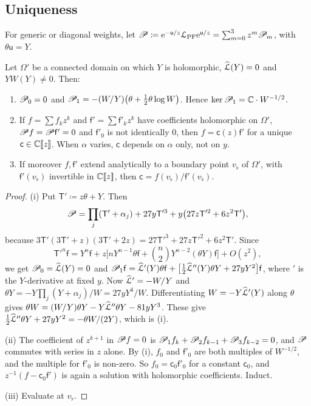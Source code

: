 \subsection{Uniqueness}
\label{sec:row-wkb}

For generic or diagonal weights, let $\mathscr{P}\coloneqq\mathrm{e}^{-\mathsf{u}/z}\mathcal{L}_{\mathrm{PF}}\mathrm{e}^{\mathsf{u}/z}=\sum_{m=0}^{3}z^m\mathscr{P}_m$, with $\theta\mathsf{u}=Y$.

\begin{lem}
\label{lem:row-wkb}
Let $\Omega'$ be a connected domain on which $Y$ is holomorphic, $\widehat{\mathcal{L}}(Y)=0$ and $YW(Y)\neq0$. Then:
\begin{enumerate}
\item $\mathscr{P}_0=0$ and $\mathscr{P}_1=-(W/Y)\big(\theta+\frac12\theta\log W\big)$. Hence $\ker\mathscr{P}_1=\mathbb{C}\cdot W^{-1/2}$.
\item If $f=\sum f_kz^k$ and $\mathsf{f}'=\sum\mathsf{f}'_kz^k$ have coefficients holomorphic on $\Omega'$, $\mathscr{P} f=\mathscr{P}\mathsf{f}'=0$ and $\mathsf{f}'_0$ is not identically $0$, then $f=\mathsf{c}(z)\mathsf{f}'$ for a unique $\mathsf{c}\in\mathbb{C}[\![ z ]\!]$. When $\alpha$ varies, $\mathsf{c}$ depends on $\alpha$ only, not on $y$.
\item If moreover $f,\mathsf{f}'$ extend analytically to a boundary point $v_{\flat}$ of $\Omega'$, with $\mathsf{f}'(v_{\flat})$ invertible in $\mathbb{C}[\![ z ]\!]$, then $\mathsf{c}=f(v_{\flat})/\mathsf{f}'(v_{\flat})$.
\end{enumerate}
\end{lem}

\begin{proof}
(i) Put $\mathsf{T}'\coloneqq z\theta+Y$. Then
\[
\mathscr{P}=\prod_j(\mathsf{T}'+\alpha_j)+27y\mathsf{T}'^3+y\big(27z\mathsf{T}'^2+6z^2\mathsf{T}'\big),
\]
because $3\mathsf{T}'(3\mathsf{T}'+z)(3\mathsf{T}'+2z)=27\mathsf{T}'^3+27z\mathsf{T}'^2+6z^2\mathsf{T}'$. Since
\[
\mathsf{T}'^n\mathsf{f}=Y^n\mathsf{f}+z\Big[nY^{n-1}\theta\mathsf{f}+\binom n2Y^{n-2}(\theta Y)\mathsf{f}\Big]+O(z^2),
\]
we get $\mathscr{P}_0=\widehat{\mathcal{L}}(Y)=0$ and $\mathscr{P}_1\mathsf{f}=\widehat{\mathcal{L}}'(Y)\theta\mathsf{f}+\big[\frac12\widehat{\mathcal{L}}''(Y)\theta Y+27yY^2\big]\mathsf{f}$, where $'$ is the $Y$-derivative at fixed $y$. Now $\widehat{\mathcal{L}}'=-W/Y$ and $\theta Y=-Y\prod_j(Y+\alpha_j)/W=27yY^4/W$. Differentiating $W=-Y\widehat{\mathcal{L}}'(Y)$ along $\theta$ gives $\theta W=(W/Y)\theta Y-Y\widehat{\mathcal{L}}''\theta Y-81yY^3$. These give $\frac12\widehat{\mathcal{L}}''\theta Y+27yY^2=-\theta W/(2Y)$, which is (i).

(ii) The coefficient of $z^{k+1}$ in $\mathscr{P} f=0$ is $\mathscr{P}_1f_k+\mathscr{P}_2f_{k-1}+\mathscr{P}_3f_{k-2}=0$, and $\mathscr{P}$ commutes with series in $z$ alone. By (i), $f_0$ and $\mathsf{f}'_0$ are both multiples of $W^{-1/2}$, and the multiple for $\mathsf{f}'_0$ is non-zero. So $f_0=\mathsf{c}_0\mathsf{f}'_0$ for a constant $\mathsf{c}_0$, and $z^{-1}(f-\mathsf{c}_0\mathsf{f}')$ is again a solution with holomorphic coefficients. Induct.

(iii) Evaluate at $v_\flat$.
\end{proof}

